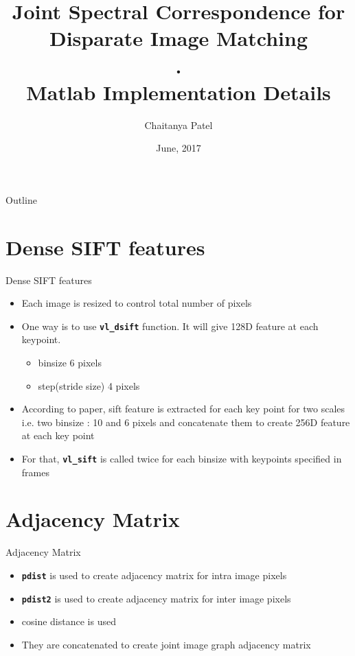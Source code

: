 \documentclass{beamer}
\title[Joint Spectral Correspondence for Disparate Image Matching]{Joint Spectral Correspondence for Disparate Image Matching \\ . \\ \large Matlab Implementation Details}
\author{Chaitanya Patel}
\institute{CVIT, IIIT-Hyderabad}
\date{June, 2017}
\begin{document}
\begin{frame}
  \titlepage
\end{frame}

\begin{frame}{Outline}
  \tableofcontents
\end{frame}


\section{Dense SIFT features}
\begin{frame}{Dense SIFT features}
\begin{itemize}
\item Each image is resized to control total number of pixels
\item One way is to use \textbf{\texttt{vl\_dsift}} function. It will give 128D feature at each keypoint.      	  \begin{itemize}
	\item binsize 6 pixels 
   	\item step(stride size) 4 pixels
\end{itemize}
\item According to paper, sift feature is extracted for each key point for two scales i.e. two binsize : 10 and 6 pixels and concatenate them to create 256D feature at each key point
\item For that, \textbf{\texttt{vl\_sift}} is called twice for each binsize with keypoints specified in frames
\end{itemize}
\end{frame}

\section{Adjacency Matrix}
\begin{frame}{Adjacency Matrix}
\begin{itemize}

\item \textbf{\texttt{pdist}} is used to create adjacency matrix for intra image pixels
\item \textbf{\texttt{pdist2}} is used to create adjacency matrix for inter image pixels
\item cosine distance is used
\item They are concatenated to create joint image graph adjacency matrix

\end{itemize}
\end{frame}
\end{document}
